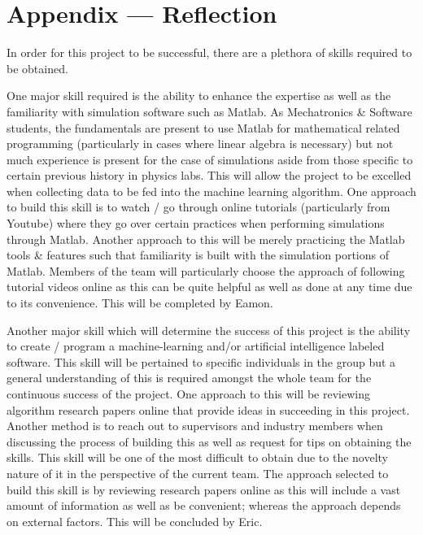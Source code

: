 \documentclass[12pt, titlepage]{article}
\begin{document}
\section*{Appendix --- Reflection}
In order for this project to be successful, there are a plethora of skills required to be obtained. 
\par
One major skill required is the ability to enhance the expertise as well as the familiarity with simulation software such as Matlab. As Mechatronics \& Software students, the fundamentals are present to use Matlab for mathematical related programming (particularly in cases where linear algebra is necessary) but not much experience is present for the case of simulations aside from those specific to certain previous history in physics labs. This will allow the project to be excelled when collecting data to be fed into the machine learning algorithm. One approach to build this skill is to watch / go through online tutorials (particularly from Youtube) where they go over certain practices when performing simulations through Matlab. Another approach to this will be merely practicing the Matlab tools \& features such that familiarity is built with the simulation portions of Matlab. Members of the team will particularly choose the approach of following tutorial videos online as this can be quite helpful as well as done at any time due to its convenience. This will be completed by Eamon. 
\par
Another major skill which will determine the success of this project is the ability to create / program a machine-learning and/or artificial intelligence labeled software. This skill will be pertained to specific individuals in the group but a general understanding of this is required amongst the whole team for the continuous success of the project. One approach to this will be reviewing algorithm research papers online that provide ideas in succeeding in this project. Another method is to reach out to supervisors and industry members when discussing the process of building this as well as request for tips on obtaining the skills. This skill will be one of the most difficult to obtain due to the novelty nature of it in the perspective of the current team. The approach selected to build this skill is by reviewing research papers online as this will include a vast amount of information as well as be convenient; whereas the approach depends on external factors. This will be concluded by Eric.
\par
\end{document}
